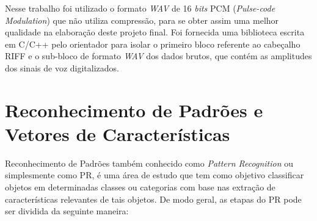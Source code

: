 \documentclass[a4paper,12pt,twoside,openright]{report}
\begin{document}
\par Nesse trabalho foi utilizado o formato \textit{WAV} de 16 \textit{bits} PCM (\textit{Pulse-code Modulation}) que n\~{a}o utiliza compress\~{a}o, para se obter assim uma melhor qualidade na elabora\c{c}\~{a}o deste projeto final. Foi fornecida uma biblioteca escrita em C/C++ pelo orientador para isolar o primeiro bloco referente ao cabe{\c c}alho RIFF e o sub-bloco de formato \textit{WAV} dos dados brutos, que cont\'{e}m as amplitudes dos sinais de voz digitalizados.

  

\section{Reconhecimento de Padr\~{o}es e Vetores de Caracter\'{i}sticas}
\label{reconhecimento_padroes_vetores_caracteristicas}

\par Reconhecimento de Padr\~{o}es tamb\'{e}m conhecido como \textit{Pattern Recognition} ou simplesmente como PR, \'{e} uma \'{a}rea de estudo que tem como objetivo classificar objetos em determinadas classes ou categorias com base nas extra{\c c}\~{a}o de caracter\'{i}sticas relevantes de tais objetos. De modo geral, as etapas do PR pode ser dividida da seguinte maneira:
\end{document}
